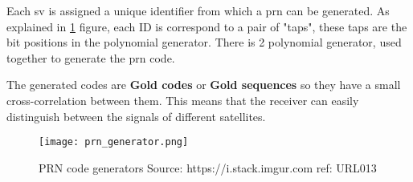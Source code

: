 Each \gls{sv} is assigned a unique identifier from which a \gls{prn} can be generated. As explained in \ref{fig:prn_generator} figure, each ID is correspond to a pair of "taps", these taps are the bit positions in the polynomial generator. There is 2 polynomial generator, used together to generate the \gls{prn} code.

The generated codes are \textbf{Gold codes} or \textbf{Gold sequences} so they have a small cross-correlation between them. This means that the receiver can easily distinguish between the signals of different satellites.

\begin{figure}[H]
	\centering
	\texttt{[image: prn\_generator.png]}
	\caption[PRN code generators]{PRN code generators Source: https://i.stack.imgur.com ref: URL013}
	\label{fig:prn_generator}
\end{figure}



